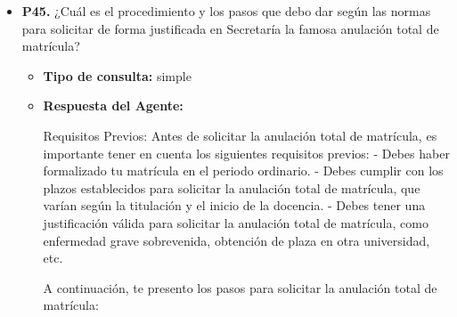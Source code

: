 \documentclass{article}
\begin{document}
\begin{itemize}
\begin{itemize}
                        Recuerde que la inscripción en el concurso es un proceso abierto que solo finaliza cuando concluye el plazo de presentación de solicitudes. Por lo tanto, puede modificar los méritos y documentación aportados cuantas veces desee dentro del plazo de presentación de solicitudes.
                  \item \textbf{Contexto utilizado:}

            \end{itemize}

      \item \textbf{P45.} ¿Cuál es el procedimiento y los pasos que debo dar según las normas para solicitar de forma justificada en Secretaría la famosa anulación total de matrícula? \\
            \begin{itemize}
                  \item \textbf{Tipo de consulta:} simple
                  \item \textbf{Respuesta del Agente:}

                        Requisitos Previos:
                        Antes de solicitar la anulación total de matrícula, es importante tener en cuenta los siguientes requisitos previos:
                        - Debes haber formalizado tu matrícula en el periodo ordinario.
                        - Debes cumplir con los plazos establecidos para solicitar la anulación total de matrícula, que varían según la titulación y el inicio de la docencia.
                        - Debes tener una justificación válida para solicitar la anulación total de matrícula, como enfermedad grave sobrevenida, obtención de plaza en otra universidad, etc.

                        A continuación, te presento los pasos para solicitar la anulación total de matrícula:


\end{itemize}
\end{itemize}
\end{document}

